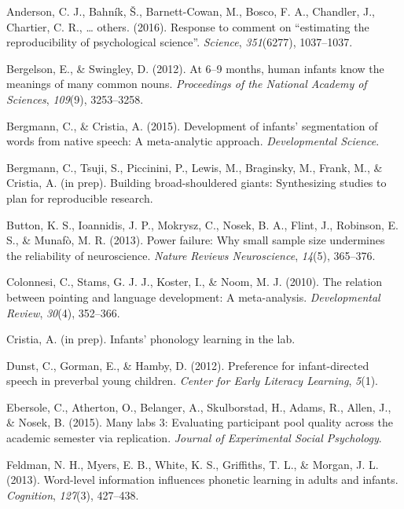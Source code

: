 \documentclass[english,floatsintext,man]{apa6}
\begin{document}
\hypertarget{refs}{}
\hypertarget{ref-anderson2016response}{}
Anderson, C. J., Bahník, Š., Barnett-Cowan, M., Bosco, F. A., Chandler,
J., Chartier, C. R., \ldots{} others. (2016). Response to comment on
``estimating the reproducibility of psychological science''.
\emph{Science}, \emph{351}(6277), 1037--1037.

\hypertarget{ref-bergelson2016}{}
Bergelson, E., \& Swingley, D. (2012). At 6--9 months, human infants
know the meanings of many common nouns. \emph{Proceedings of the
National Academy of Sciences}, \emph{109}(9), 3253--3258.

\hypertarget{ref-bergmann2015development}{}
Bergmann, C., \& Cristia, A. (2015). Development of infants'
segmentation of words from native speech: A meta-analytic approach.
\emph{Developmental Science}.

\hypertarget{ref-bergmanneducational}{}
Bergmann, C., Tsuji, S., Piccinini, P., Lewis, M., Braginsky, M., Frank,
M., \& Cristia, A. (in prep). Building broad-shouldered giants:
Synthesizing studies to plan for reproducible research.

\hypertarget{ref-button2013power}{}
Button, K. S., Ioannidis, J. P., Mokrysz, C., Nosek, B. A., Flint, J.,
Robinson, E. S., \& Munafò, M. R. (2013). Power failure: Why small
sample size undermines the reliability of neuroscience. \emph{Nature
Reviews Neuroscience}, \emph{14}(5), 365--376.

\hypertarget{ref-colonnesi2010relation}{}
Colonnesi, C., Stams, G. J. J., Koster, I., \& Noom, M. J. (2010). The
relation between pointing and language development: A meta-analysis.
\emph{Developmental Review}, \emph{30}(4), 352--366.

\hypertarget{ref-cristiastatisticalinprep}{}
Cristia, A. (in prep). Infants' phonology learning in the lab.

\hypertarget{ref-dunst2012preference}{}
Dunst, C., Gorman, E., \& Hamby, D. (2012). Preference for
infant-directed speech in preverbal young children. \emph{Center for
Early Literacy Learning}, \emph{5}(1).

\hypertarget{ref-ebersole2015many}{}
Ebersole, C., Atherton, O., Belanger, A., Skulborstad, H., Adams, R.,
Allen, J., \& Nosek, B. (2015). Many labs 3: Evaluating participant pool
quality across the academic semester via replication. \emph{Journal of
Experimental Social Psychology}.

\hypertarget{ref-feldman2013word}{}
Feldman, N. H., Myers, E. B., White, K. S., Griffiths, T. L., \& Morgan,
J. L. (2013). Word-level information influences phonetic learning in
adults and infants. \emph{Cognition}, \emph{127}(3), 427--438.
\end{document}
